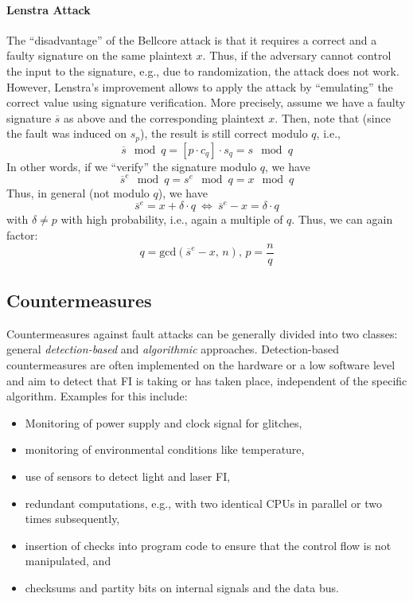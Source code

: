 \paragraph{Lenstra Attack}
The ``disadvantage'' of the  Bellcore attack is that it requires a correct and a faulty signature on the same plaintext $x$. Thus, if the adversary cannot control the input to the signature, e.g., due to randomization, the attack does not work. However, Lenstra's improvement allows to apply the attack by ``emulating'' the correct value using signature verification. More precisely, assume we have a faulty signature $\overline{s}$ as above and the corresponding plaintext $x$. Then, note that (since the fault was induced on $s_p$), the result is still correct modulo $q$, i.e.,
$$
\overline{s} \mod q = \left[p \cdot c_q\right] \cdot s_q = s \mod q
$$
In other words, if we ``verify'' the signature modulo $q$, we have
$$
\overline{s}^e \mod q = s^e \mod q = x \mod q
$$
Thus, in general (not modulo $q$), we have
$$
\overline{s}^e = x + \delta \cdot q\ \Leftrightarrow\ \overline{s}^e - x = \delta \cdot q
$$
with $\delta \neq p$ with high probability, i.e., again a multiple of $q$. Thus, we can again factor:
$$
q = \mbox{gcd}\left(\overline{s}^e - x,\,n\right),\, p = \frac{n}{q}
$$




\subsection{Countermeasures}
Countermeasures against fault attacks can be generally divided into two classes: general \emph{detection-based} and \emph{algorithmic} approaches. Detection-based countermeasures are often implemented on the hardware or a low software level and aim to detect that \ac{FI} is taking or has taken place, independent of the specific algorithm. Examples for this include:

\begin{itemize}
	\item Monitoring of power supply and clock signal for glitches,
	\item monitoring of environmental conditions like temperature, 
	\item use of sensors to detect light and laser \ac{FI},
	\item redundant computations, e.g., with two identical \acp{CPU} in parallel or two times subsequently,
	\item insertion of checks into program code to ensure that the control flow is not manipulated, and
	\item checksums and partity bits on internal signals and the data bus.
\end{itemize}

